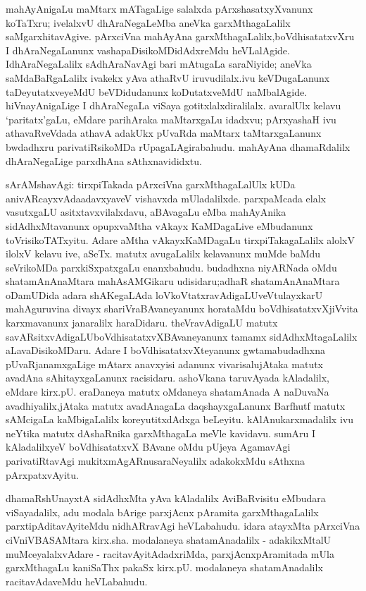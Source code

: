 mahAyAnigaLu maMtarx mATagaLige salalxda pArxshasatxyXvanunx koTaTxru; ivelalxvU dhAraNegaLeMba aneVka garxMthagaLalilx saMgarxhitavAgive. pArxciVna mahAyAna garxMthagaLalilx,\break boVdhisatatxvXru I dhAraNegaLanunx vashapaDisikoMDidAdxreMdu heVLalAgide. I\break dhAraNegaLalilx sAdhAraNavAgi bari mAtugaLa saraNiyide; aneVka saMdaBaRgaLalilx ivakekx yAva athaRvU iruvudilalx.ivu keVDugaLanunx taDeyutatxveyeMdU beVDidudanunx koDutatxveMdU naMbalAgide. hiVnayAnigaLige I dhAraNegaLa viSaya gotitxlalx\-diralilalx. avaralUlx kelavu `paritatx'gaLu, eMdare parihAraka maMtarxgaLu idadxvu; pArxyashaH ivu athavaRveVdada athavA adakUkx pUvaRda maMtarx taMtarxgaLanunx bwdadhxru parivatiRsikoMDa rUpagaLAgirabahudu. mahAyAna dhamaRdalilx dhAraNegaLige parxdhAna sAthxnavididxtu.

sArAMshavAgi: tirxpiTakada pArxciVna garxMthagaLalUlx kUDa anivARcayxvAda\break adavxyaveV vishavxda mUladalilxde. parxpaMcada elalx vasutxgaLU asitxtavxvilalxdavu, aBAva\-gaLu eMba mahAyAnika sidAdhxMtavanunx opupxvaMtha vAkayx KaMDagaLive eMbudanunx toVrisikoTATxyitu. Adare aMtha vAkayxKaMDagaLu tirxpiTakagaLalilx alolxV ilolxV kelavu ive, aSeTx. matutx avugaLalilx kelavanunx muMde baMdu seVrikoMDa parxkiSxpatxgaLu enanx\-bahudu. budadhxna niyARNada oMdu shatamAnAnaMtara mahAsAMGikaru udi\-sidaru;\break adhaR shatamAnAnaMtara oDamUDida adara shAKegaLAda loVkoVtatxravAdigaLU\break veVtulayxkarU mahAguruvina divayx shariVraBAvaneyanunx horataMdu boVdhisatatxvX\break jiVvita karxmavanunx janaralilx haraDidaru. theVravAdigaLU matutx savARsitxvAdigaLU\break boVdhisatatxvXBAvaneyanunx tamamx sidAdhxMtagaLalilx aLavaDisikoMDaru. Adare I boVdhi\-satatxvXteyanunx gwtamabudadhxna pUvaRjanamxgaLige mAtarx anavxyisi adanunx vivarisalu\break jAtaka matutx avadAna sAhitayxgaLanunx racisidaru. ashoVkana taruvAyada kAladalilx, eMdare kirx.pU. eraDaneya matutx oMdaneya shatamAnada A naDuvaNa avadhiyalilx,\break jAtaka matutx avadAnagaLa daqshayxgaLanunx Barfhutf matutx sAMcigaLa kaMbigaLalilx kore\-yutitxdAdxga beLeyitu. kAlAnukarxmadalilx ivu neYtika matutx dAshaRnika garxMthagaLa meVle kavidavu. sumAru I kAladalilxyeV boVdhisatatxvX BAvane oMdu pUjeya Agama\-vAgi parivatiRtavAgi mukitxmAgARnusaraNeyalilx adakokxMdu sAthxna pArxpatxvAyitu.

dhamaRshUnayxtA sidAdhxMta yAva kAladalilx AviBaRvisitu eMbudara viSayadalilx, adu modala bArige parxjAcnx pAramita garxMthagaLalilx parxtipAditavAyiteMdu nidhARra\-vAgi heVLabahudu. idara atayxMta pArxciVna ciVniVBASAMtara kirx.sha. modalaneya shatamAnadalilx - adakikxMtalU muMceyalalxvAdare - racitavAyitAdadxriMda, parxjAcnxpAramitada mUla garxMthagaLu kaniSaThx pakaSx kirx.pU. modalaneya shatamAnadalilx racitavAdaveMdu heVLabahudu.


